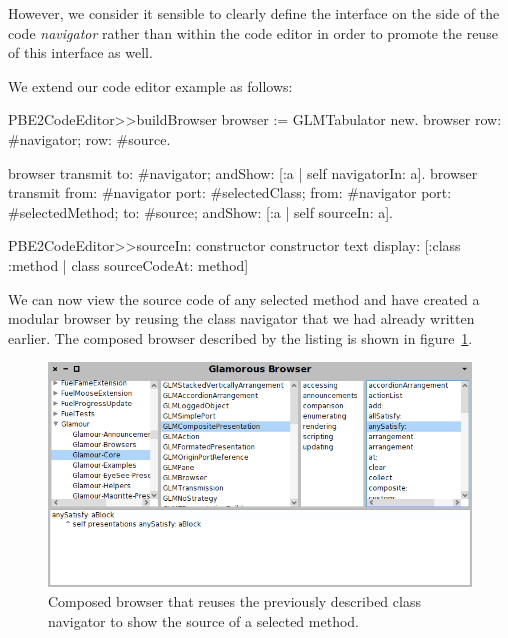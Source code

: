 \documentclass[a4paper,10pt,twoside]{book}
\begin{document}
However, we consider it sensible to clearly define the interface on
the side of the code \emph{navigator} rather than within the code
editor in order to promote the reuse of this interface as well.



We extend our code editor example as follows:

\begin{code}{}
PBE2CodeEditor>>buildBrowser 
	browser := GLMTabulator new.
	browser 
		row: #navigator;
		row: #source.
		
	browser transmit to: #navigator; andShow:  [:a | self navigatorIn: a]. 
	browser transmit
		from:  #navigator port: #selectedClass;
		from: #navigator port: #selectedMethod;
		to: #source;
		andShow:  [:a | self sourceIn: a].

PBE2CodeEditor>>sourceIn: constructor
	constructor text
		display: [:class :method | class sourceCodeAt: method] 
\end{code}


We can now view the source code of any selected method and have
created a modular browser by reusing the class navigator that we had
already written earlier. The composed browser described by the listing
is shown in figure~\ref{fig:composed-browser}.

\begin{figure}[htbp]
\centerline{\includegraphics[width=\linewidth]{classbrowser.png}}
\caption{Composed browser that reuses the previously described class navigator to show the source of a selected method.}
\label{fig:composed-browser}
\end{figure}
\end{document}
